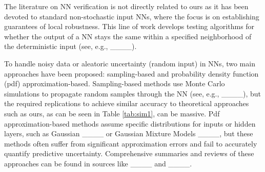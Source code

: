 \begin{comment}
To accommodate noisy data or aleatoric uncertainty (random input) in NNs directly, sampling-based and pdf approximation-based methods have been proposed. The former propagate randomness by mapping a set of samples through the NN based on which either features (e.g. moments) of the output distribution or the output distribution itself is derived. Monte Carlo simulation is used to draw random samples from the input  distribution, which are consequently propagated through the neural network to aggregate an output distribution. The training of large NNs is already computationally costly, and repeating this process a large number of times compounds the computational complexity without addressing the fundamental issue of the noise in the data deriving from their being a sample from a much larger population 
(see, e.g., ____). The core idea of pdf approximation-based methods is to assume the input, or the hidden layers of a NN have specific distributions. For example, ____ assume the distribution in each layer to be Gaussian and study their propagation through sigmoid NNs. ____ approximate input distributions with Gaussian Mixture Models. 
However, these methods suffer from significant approximation errors and are unable to accurately quantify predictive uncertainty in the NN output due to restrictive assumptions about the distributions in the input, their parameters, and hidden, or output layer. %
A summary of approaches to uncertainty estimation in neural networks can be found in ____ and a review in ____. 
\end{comment}

The literature on NN verification is not directly related to ours as it has been devoted to standard non-stochastic input NNs, where the focus is on establishing guarantees of local robustness. This line of work develops testing algorithms for whether the output of a NN stays the same within a specified neighborhood of the deterministic input (see, e.g., ____). 

To handle noisy data or aleatoric uncertainty (random input) in NNs, two main approaches have been proposed: sampling-based and probability density function (pdf) approximation-based. Sampling-based methods use Monte Carlo simulations to propagate random samples through the NN (see, e.g., ____), but the required replications to achieve similar accuracy to theoretical approaches such as ours, as can be seen in Table \ref{tab:sim1}, can be massive. Pdf approximation-based methods assume specific distributions for inputs or hidden layers, such as Gaussian ____ or Gaussian Mixture Models ____, but these methods often suffer from significant approximation errors and fail to accurately quantify predictive uncertainty. Comprehensive summaries and reviews of these approaches can be found in sources like ____ and  ____.


